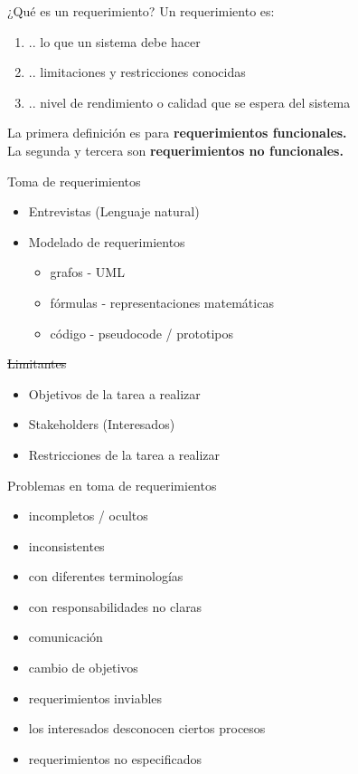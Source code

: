 \documentclass[
  24pt, %
  aspectratio=169, %
]{beamer}
\begin{document}
\begin{frame}{¿Qué es un requerimiento?}
  Un requerimiento es:
  \begin{enumerate}
  \item .. lo que un sistema debe hacer
  \item .. limitaciones y restricciones conocidas
  \item .. nivel de rendimiento o calidad que se espera del sistema
  \end{enumerate}
  \bigskip %
  \pause
  La primera definición es para \textbf{requerimientos funcionales.}\\
  \bigskip %
  La segunda y tercera son \textbf{requerimientos no funcionales.}
  
\end{frame}

\begin{frame}{Toma de requerimientos}
  \begin{itemize}
  \item Entrevistas (Lenguaje natural)
  \item Modelado de requerimientos
    \begin{itemize}
    \item grafos - UML
    \item fórmulas - representaciones matemáticas
    \item código - pseudocode / prototipos
    \end{itemize}
  \end{itemize}
  \bigskip %
  \pause
  \st{Limitantes}
  \begin{itemize}
  \item Objetivos de la tarea a realizar
  \item Stakeholders (Interesados)
  \item Restricciones de la tarea a realizar
  \end{itemize}
\end{frame}

\begin{frame}{Problemas en toma de requerimientos}
  \begin{itemize}
  \item incompletos / ocultos 
  \item inconsistentes
  \item con diferentes terminologías
  \item con responsabilidades no claras
  \item comunicación
  \item cambio de objetivos
  \item requerimientos inviables
  \item los interesados desconocen ciertos procesos
  \item requerimientos no especificados
  \end{itemize}
\end{frame}
\end{document}
